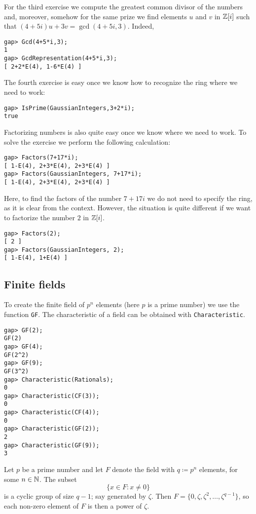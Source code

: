 \begin{example}
For the third exercise we compute the greatest common divisor 
of the numbers and, moreover, somehow for the same prize 
we find elements 
$u$ and $v$ in $\mathbb{Z}[i]$ such that 
$(4+5i)u+3v=\gcd(4+5i,3)$. Indeed, 
\begin{lstlisting}
gap> Gcd(4+5*i,3);                     
1
gap> GcdRepresentation(4+5*i,3);
[ 2+2*E(4), 1-6*E(4) ]
\end{lstlisting}

The fourth exercise is easy once we know how to recognize the ring where we need to work:
\begin{lstlisting}
gap> IsPrime(GaussianIntegers,3+2*i);
true
\end{lstlisting}

Factorizing numbers is also quite easy once we know where we need to work. To solve the 
exercise we perform the following calculation: 
\begin{lstlisting}
gap> Factors(7+17*i);
[ 1-E(4), 2+3*E(4), 2+3*E(4) ]
gap> Factors(GaussianIntegers, 7+17*i);
[ 1-E(4), 2+3*E(4), 2+3*E(4) ]
\end{lstlisting}
Here, to find the factors of the number $7+17i$ we 
do not need to specify the ring, as it is clear from the context. However, 
the situation is quite different if we want to factorize the number $2$ in $\mathbb{Z}[i]$. 
\begin{lstlisting}
gap> Factors(2);                       
[ 2 ]
gap> Factors(GaussianIntegers, 2);     
[ 1-E(4), 1+E(4) ]
\end{lstlisting}
\end{example}


\subsection*{Finite fields}
To create the finite field of $p^n$
elements (here $p$ is a prime number) we use the function \lstinline{GF}.  The
characteristic of a field can be obtained with \lstinline{Characteristic}. 
\begin{lstlisting}
gap> GF(2);                                                           
GF(2)
gap> GF(4);
GF(2^2)
gap> GF(9);
GF(3^2)
gap> Characteristic(Rationals);
0
gap> Characteristic(CF(3));
0
gap> Characteristic(CF(4));
0
gap> Characteristic(GF(2));
2
gap> Characteristic(GF(9));
3
\end{lstlisting}

Let $p$ be a prime number and let $F$ denote the field with $q\coloneqq p^n$ elements, for some $n\in\mathbb{N}$. 
The subset 
\[
  \{x\in F:x\ne 0\}
\]
is a cyclic group of size $q-1$; say generated by $\zeta$. Then
$F=\{0,\zeta,\zeta^2,\dots,\zeta^{q-1}\}$, so each non-zero element of $F$ is
then a power of $\zeta$.  

